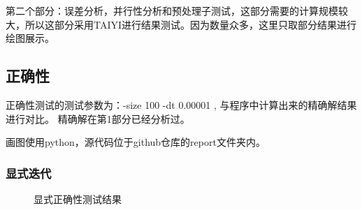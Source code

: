 \documentclass[10pt, a4paper]{article}
\begin{document}
第二个部分：误差分析，并行性分析和预处理子测试，这部分需要的计算规模较大，所以这部分采用TAIYI进行结果测试。因为数量众多，这里只取部分结果进行绘图展示。
\subsection{正确性}
正确性测试的测试参数为：-size 100 -dt 0.00001 , 与程序中计算出来的精确解结果进行对比。
精确解在第1部分已经分析过。

画图使用python，源代码位于github仓库的report文件夹内。
\subsubsection{显式迭代}
\begin{figure}[H]
\centering
{}%
%
\centering
\caption{ 显式正确性测试结果}
\end{figure}
\end{document}
